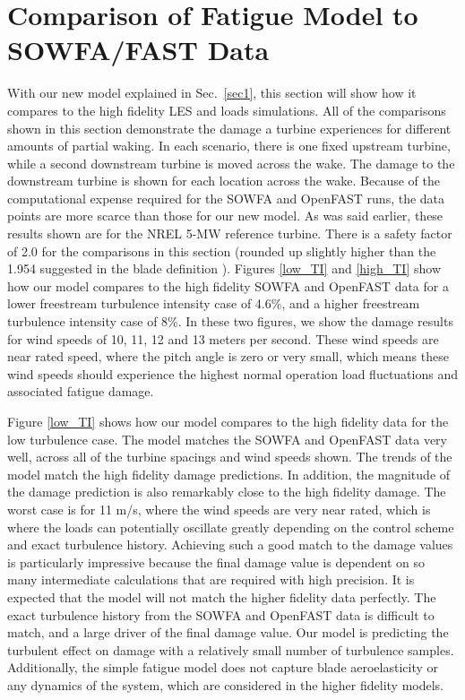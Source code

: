 \documentclass[11pt,letterpaper]{article}
\begin{document}
\section{Comparison of Fatigue Model to SOWFA/FAST Data}
With our new model explained in Sec.~\ref{sec1}, this section will show how it compares to the high fidelity LES and loads simulations. All of the comparisons shown in this section demonstrate the damage a turbine experiences for different amounts of partial waking. In each scenario, there is one fixed upstream turbine, while a second downstream turbine is moved across the wake. The damage to the downstream turbine is shown for each location across the wake. Because of the computational expense required for the SOWFA and OpenFAST runs, the data points are more scarce than those for our new model. As was said earlier, these results shown are for the NREL 5-MW reference turbine. There is a safety factor of 2.0 for the comparisons in this section (rounded up slightly higher than the 1.954 suggested in the blade definition \cite{resor2013definition}). Figures \ref{low_TI} and \ref{high_TI} show how our model compares to the high fidelity SOWFA and OpenFAST data for a lower freestream turbulence intensity case of 4.6\%, and a higher freestream turbulence intensity case of 8\%. In these two figures, we show the damage results for wind speeds of 10, 11, 12 and 13 meters per second. These wind speeds are near rated speed, where the pitch angle is zero or very small, which means these wind speeds should experience the highest normal operation load fluctuations and associated fatigue damage.

Figure \ref{low_TI} shows how our model compares to the high fidelity data for the low turbulence case. The model matches the SOWFA and OpenFAST data very well, across all of the turbine spacings and wind speeds shown. The trends of the model match the high fidelity damage predictions. In addition, the magnitude of the damage prediction is also remarkably close to the high fidelity damage. The worst case is for 11 m/s, where the wind speeds are very near rated, which is where the loads can potentially oscillate greatly depending on the control scheme and exact turbulence history. Achieving such a good match to the damage values is particularly impressive because the final damage value is dependent on so many intermediate calculations that are required with high precision. It is expected that the model will not match the higher fidelity data perfectly. The exact turbulence history from the SOWFA and OpenFAST data is difficult to match, and a large driver of the final damage value. Our model is predicting the turbulent effect on damage with a relatively small number of turbulence samples. Additionally, the simple fatigue model does not capture blade aeroelasticity or any dynamics of the system, which are considered in the higher fidelity models.
\end{document}
